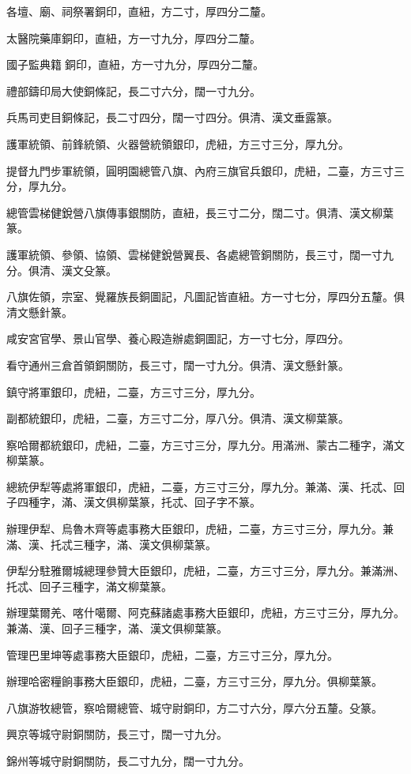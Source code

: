 \begin{pinyinscope}
各壇、廟、祠祭署銅印，直紐，方二寸，厚四分二釐。

太醫院藥庫銅印，直紐，方一寸九分，厚四分二釐。

國子監典籍銅印，直紐，方一寸九分，厚四分二釐。

禮部鑄印局大使銅條記，長二寸六分，闊一寸九分。

兵馬司吏目銅條記，長二寸四分，闊一寸四分。俱清、漢文垂露篆。

護軍統領、前鋒統領、火器營統領銀印，虎紐，方三寸三分，厚九分。

提督九門步軍統領，圓明園總管八旗、內府三旗官兵銀印，虎紐，二臺，方三寸三分，厚九分。

總管雲梯健銳營八旗傳事銀關防，直紐，長三寸二分，闊二寸。俱清、漢文柳葉篆。

護軍統領、參領、協領、雲梯健銳營翼長、各處總管銅關防，長三寸，闊一寸九分。俱清、漢文殳篆。

八旗佐領，宗室、覺羅族長銅圖記，凡圖記皆直紐。方一寸七分，厚四分五釐。俱清文懸針篆。

咸安宮官學、景山官學、養心殿造辦處銅圖記，方一寸七分，厚四分。

看守通州三倉首領銅關防，長三寸，闊一寸九分。俱清、漢文懸針篆。

鎮守將軍銀印，虎紐，二臺，方三寸三分，厚九分。

副都統銀印，虎紐，二臺，方三寸二分，厚八分。俱清、漢文柳葉篆。

察哈爾都統銀印，虎紐，二臺，方三寸三分，厚九分。用滿洲、蒙古二種字，滿文柳葉篆。

總統伊犁等處將軍銀印，虎紐，二臺，方三寸三分，厚九分。兼滿、漢、托忒、回子四種字，滿、漢文俱柳葉篆，托忒、回子字不篆。

辦理伊犁、烏魯木齊等處事務大臣銀印，虎紐，二臺，方三寸三分，厚九分。兼滿、漢、托忒三種字，滿、漢文俱柳葉篆。

伊犁分駐雅爾城總理參贊大臣銀印，虎紐，二臺，方三寸三分，厚九分。兼滿洲、托忒、回子三種字，滿文柳葉篆。

辦理葉爾羌、喀什噶爾、阿克蘇諸處事務大臣銀印，虎紐，方三寸三分，厚九分。兼滿、漢、回子三種字，滿、漢文俱柳葉篆。

管理巴里坤等處事務大臣銀印，虎紐，二臺，方三寸三分，厚九分。

辦理哈密糧餉事務大臣銀印，虎紐，二臺，方三寸三分，厚九分。俱柳葉篆。

八旗游牧總管，察哈爾總管、城守尉銅印，方二寸六分，厚六分五釐。殳篆。

興京等城守尉銅關防，長三寸，闊一寸九分。

錦州等城守尉銅關防，長二寸九分，闊一寸九分。


\end{pinyinscope}

